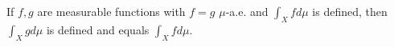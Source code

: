 If $f, g$ are measurable functions with $f = g$ $\mu$-a.e. and $\int_X f d\mu$ is defined, then $\int_X g d\mu$ is defined and equals $\int_X f d\mu$.
